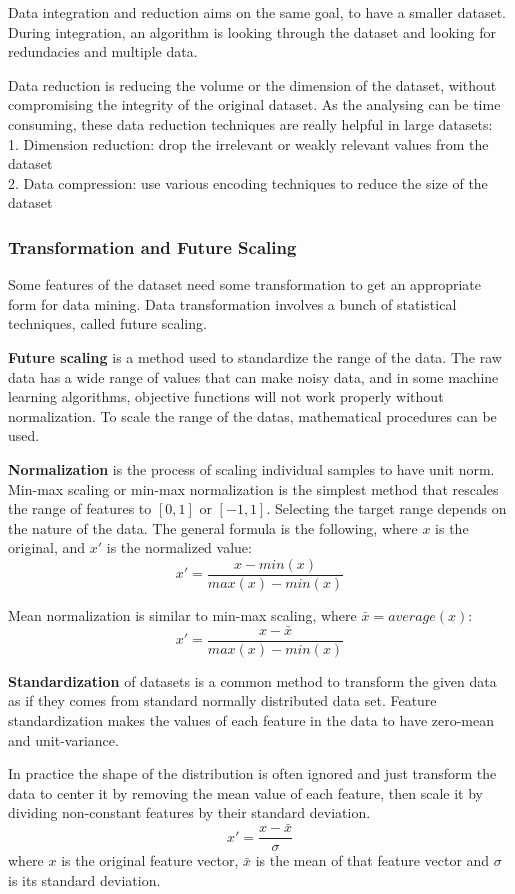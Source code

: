 Data integration and reduction aims on the same goal, to have a smaller dataset. During integration, an algorithm is looking through the dataset and looking for redundacies and multiple data. \medskip

Data reduction is reducing the volume or the dimension of the dataset, without compromising the integrity of the original dataset. As the analysing can be time consuming, these data reduction techniques are really helpful in large datasets:\\
1. Dimension reduction: drop the irrelevant or weakly relevant values from the dataset\\
2. Data compression: use various encoding techniques to reduce the size of the dataset


\subsubsection{Transformation and Future Scaling}

Some features of the dataset need some transformation to get an appropriate form for data mining. Data transformation involves a bunch of statistical techniques, called future scaling. \bigskip

\textbf{Future scaling} is a method used to standardize the range of the data. The raw data has a wide range of values that can make noisy data, and in some machine learning algorithms, objective functions will not work properly without normalization. To scale the range of the datas, mathematical procedures can be used.\medskip

\textbf{Normalization} is the process of scaling individual samples to have unit norm. Min-max scaling or min-max normalization is the simplest method that rescales the range of features to $[0, 1]$ or $[-1, 1]$. Selecting the target range depends on the nature of the data. The general formula is the following, where $x$ is the original, and $x'$ is the normalized value:
$$ x' = \frac{x-min(x)}{max(x)-min(x)} $$

\noindent Mean normalization is similar to min-max scaling, where $\bar x = average(x)$:
$$ x' = \frac{x-\bar x}{max(x)-min(x)} $$ \medskip

\textbf{Standardization} of datasets is a common method to transform the given data as if they comes from standard normally distributed data set. Feature standardization makes the values of each feature in the data to have zero-mean and unit-variance. \smallskip
	
In practice the shape of the distribution is often ignored and just transform the data to center it by removing the mean value of each feature, then scale it by dividing non-constant features by their standard deviation.
$$ x'= \frac{x-\bar x}{\sigma} $$
where $x$ is the original feature vector, $\bar x$ is the mean of that feature vector and $\sigma$ is its standard deviation.\bigskip

